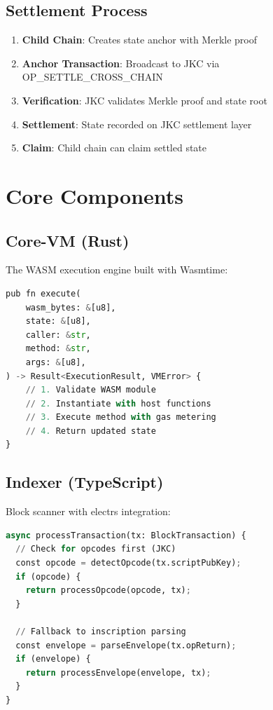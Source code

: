 \documentclass[a4paper,11pt]{article}
\begin{document}
\subsection{Settlement Process}

\begin{enumerate}
    \item \textbf{Child Chain}: Creates state anchor with Merkle proof
    \item \textbf{Anchor Transaction}: Broadcast to JKC via OP\_SETTLE\_CROSS\_CHAIN
    \item \textbf{Verification}: JKC validates Merkle proof and state root
    \item \textbf{Settlement}: State recorded on JKC settlement layer
    \item \textbf{Claim}: Child chain can claim settled state
\end{enumerate}

\section{Core Components}

\subsection{Core-VM (Rust)}

The WASM execution engine built with Wasmtime:

\begin{lstlisting}[language=Python, caption={VM Execution}]
pub fn execute(
    wasm_bytes: &[u8],
    state: &[u8],
    caller: &str,
    method: &str,
    args: &[u8],
) -> Result<ExecutionResult, VMError> {
    // 1. Validate WASM module
    // 2. Instantiate with host functions
    // 3. Execute method with gas metering
    // 4. Return updated state
}
\end{lstlisting}

\subsection{Indexer (TypeScript)}

Block scanner with electrs integration:

\begin{lstlisting}[language=Python, caption={Scanner Logic}]
async processTransaction(tx: BlockTransaction) {
  // Check for opcodes first (JKC)
  const opcode = detectOpcode(tx.scriptPubKey);
  if (opcode) {
    return processOpcode(opcode, tx);
  }
  
  // Fallback to inscription parsing
  const envelope = parseEnvelope(tx.opReturn);
  if (envelope) {
    return processEnvelope(envelope, tx);
  }
}
\end{lstlisting}
\end{document}
